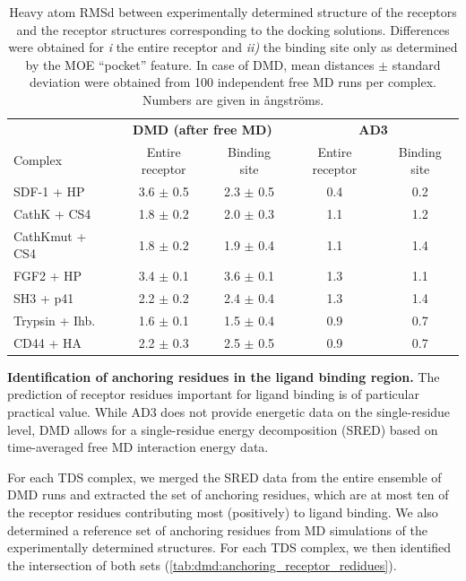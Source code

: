 \begin{table}
\tiny
\centering
\renewcommand{\arraystretch}{1.3}
\begin{tabular}{@{}lcccc@{}}
\toprule
& \multicolumn{2}{c}{\textbf{DMD (after free MD)}} & \multicolumn{2}{c}{\textbf{AD3}} \\
Complex & Entire receptor & Binding site &  Entire receptor & Binding site \\
\midrule
SDF-1 + HP & 3.6 $\pm$ 0.5 & 2.3 $\pm$ 0.5 &  0.4 & 0.2 \\
CathK + CS4 & 1.8 $\pm$ 0.2 & 2.0 $\pm$ 0.3 & 1.1 & 1.2 \\
CathKmut + CS4 & 1.8 $\pm$ 0.2 & 1.9 $\pm$ 0.4 & 1.1 & 1.4 \\
FGF2 + HP & 3.4 $\pm$ 0.1 & 3.6 $\pm$ 0.1 & 1.3 & 1.1 \\
SH3 + p41 & 2.2 $\pm$ 0.2&  2.4 $\pm$ 0.4 &  1.3 & 1.4 \\
Trypsin + Ihb. & 1.6 $\pm$ 0.1 & 1.5 $\pm$ 0.4 & 0.9 & 0.7 \\
CD44 + HA & 2.2 $\pm$ 0.3 & 2.5 $\pm$ 0.5 & 0.9 & 0.7 \\
\bottomrule
\end{tabular}
\caption{
Heavy atom RMSd between experimentally determined structure of the receptors and
the receptor structures corresponding to the docking solutions. Differences were
obtained for \textit{i} the entire receptor and \textit{ii)} the binding site
only as determined by the MOE \enquote{pocket} feature. In case of DMD, mean
distances $\pm$ standard deviation were obtained from 100 independent free MD
runs per complex. Numbers are given in ångströms.
}
\label{tab:dmd:binding_site_rmsd}
\end{table}

\vspace{1cm}
\textbf{Identification of anchoring residues in the ligand binding
region.} The prediction of receptor residues important for ligand binding is of
particular practical value. While AD3 does not provide energetic data on the
single-residue level, DMD allows for a single-residue energy decomposition
(SRED) based on time-averaged free MD interaction energy data.

For each TDS complex, we merged the SRED data from the entire ensemble of DMD
runs and extracted the set of anchoring residues, which are at most ten of the
receptor residues contributing most (positively) to ligand binding. We also
determined a reference set of anchoring residues from MD simulations of the
experimentally determined structures. For each TDS complex, we then identified
the intersection of both sets (\cref{tab:dmd:anchoring_receptor_redidues}).


